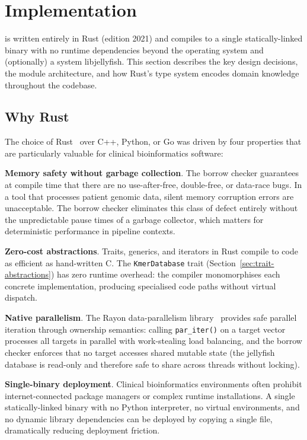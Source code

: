 \section{Implementation}
\label{sec:implementation}

\kmerdet{} is written entirely in Rust (edition 2021) and compiles to a single
statically-linked binary with no runtime dependencies beyond the operating system
and (optionally) a system libjellyfish.  This section describes the key design
decisions, the module architecture, and how Rust's type system encodes domain
knowledge throughout the codebase.

\subsection{Why Rust}
\label{sec:why-rust}

The choice of Rust~\cite{matsakis2014rust,rustlang} over C++, Python, or Go
was driven by four properties that are particularly valuable for clinical
bioinformatics software:

\textbf{Memory safety without garbage collection}.  The borrow checker guarantees
at compile time that there are no use-after-free, double-free, or data-race
bugs.  In a tool that processes patient genomic data, silent memory corruption
errors are unacceptable.  The borrow checker eliminates this class of defect
entirely without the unpredictable pause times of a garbage collector, which
matters for deterministic performance in pipeline contexts.

\textbf{Zero-cost abstractions}.  Traits, generics, and iterators in Rust
compile to code as efficient as hand-written C.  The \texttt{KmerDatabase} trait
(Section~\ref{sec:trait-abstractions}) has zero runtime overhead: the compiler
monomorphises each concrete implementation, producing specialised code paths
without virtual dispatch.

\textbf{Native parallelism}.  The Rayon data-parallelism library~\cite{rayon}
provides safe parallel iteration through ownership semantics: calling
\texttt{par\_iter()} on a target vector processes all targets in parallel with
work-stealing load balancing, and the borrow checker enforces that no target
accesses shared mutable state (the jellyfish database is read-only and therefore
safe to share across threads without locking).

\textbf{Single-binary deployment}.  Clinical bioinformatics environments often
prohibit internet-connected package managers or complex runtime installations.
A single statically-linked binary with no Python interpreter, no virtual
environments, and no dynamic library dependencies can be deployed by copying a
single file, dramatically reducing deployment friction.

